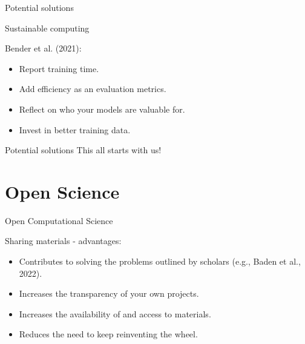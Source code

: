 \documentclass[compress]{beamer}
\begin{document}
\begin{frame}{Potential solutions}

Sustainable computing
\begin{alertblock}{Bender et al. (2021):}
\begin{itemize}
	\item Report training time.
	\item Add efficiency as an evaluation metrics.
	\item Reflect on who your models are valuable for.
	\item Invest in better training data.
\end{itemize}
\end{alertblock}
\end{frame}


\begin{frame}{Potential solutions}
This all starts with us!
\end{frame}


\section{Open Science}

\begin{frame}{Open Computational Science}
	
\begin{alertblock}{Sharing materials - advantages:}
\begin{itemize}
	\item Contributes to solving the problems outlined by scholars (e.g., Baden et al., 2022).
	\item Increases the transparency of your own projects.
	\item Increases the availability of and access to materials.
	\item Reduces the need to keep reinventing the wheel.
\end{itemize}
\end{alertblock}
\end{frame}
\end{document}
